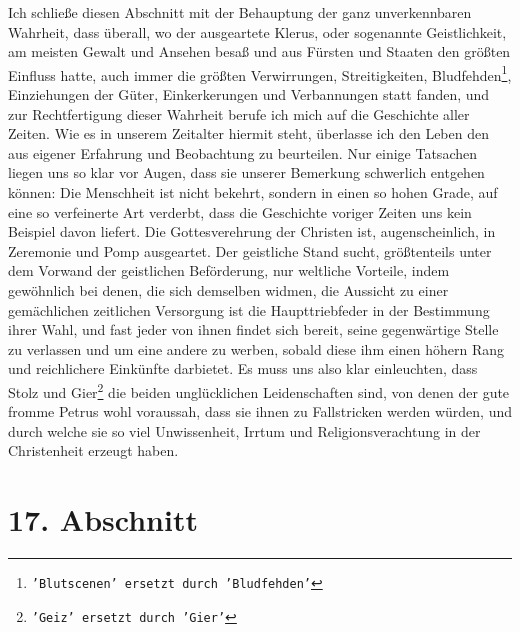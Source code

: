 Ich schließe diesen Abschnitt mit der Behauptung der ganz unverkennbaren
Wahrheit, dass überall, wo der ausgeartete
Klerus, oder sogenannte
Geistlichkeit, am meisten
Gewalt und Ansehen besaß und aus Fürsten und
Staaten den größten Einfluss hatte, auch immer die größten Verwirrungen,
Streitigkeiten, Bludfehden\footnote{\texttt{'Blutscenen' ersetzt durch
'Bludfehden'}}, Einziehungen der Güter, Einkerkerungen und
Verbannungen statt fanden, und zur Rechtfertigung dieser
Wahrheit berufe ich
mich auf die Geschichte aller Zeiten. Wie es in unserem Zeitalter hiermit steht,
überlasse ich den Leben den aus eigener Erfahrung und Beobachtung zu
beurteilen. Nur einige Tatsachen liegen uns so klar vor Augen, dass sie unserer
Bemerkung schwerlich entgehen können: Die Menschheit ist nicht
bekehrt, sondern
in einen so hohen Grade, auf eine so verfeinerte Art verderbt, dass die
Geschichte voriger Zeiten uns kein Beispiel davon liefert. Die Gottesverehrung
der Christen ist, augenscheinlich, in Zeremonie und Pomp ausgeartet. Der
geistliche Stand sucht, größtenteils unter dem Vorwand der geistlichen
Beförderung, nur weltliche Vorteile, indem gewöhnlich bei denen, die sich
demselben widmen, die Aussicht zu einer gemächlichen zeitlichen Versorgung ist
die
Haupttriebfeder in der Bestimmung ihrer Wahl, und fast jeder von ihnen findet
sich
bereit, seine gegenwärtige Stelle zu verlassen und um eine andere zu
werben, sobald diese ihm einen höhern Rang und reichlichere Einkünfte darbietet.
Es muss uns also klar einleuchten, dass Stolz und Gier\footnote{\texttt{'Geiz'
ersetzt durch 'Gier'}} die beiden unglücklichen
Leidenschaften sind, von denen der gute fromme Petrus
wohl voraussah, dass sie
ihnen zu Fallstricken werden würden, und durch welche sie so viel Unwissenheit,
Irrtum und Religionsverachtung in der Christenheit erzeugt haben.

\section{17. Abschnitt} \label{kap7_ab17}

